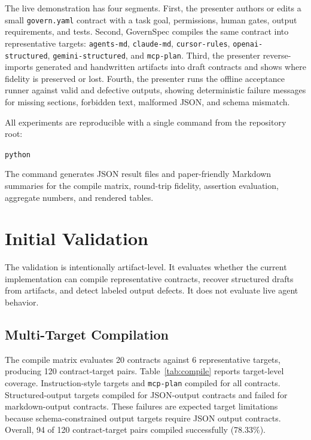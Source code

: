 \documentclass[10pt,conference]{IEEEtran}
\begin{document}
The live demonstration has four segments. First, the presenter authors or edits a
small \texttt{govern.yaml} contract with a task goal, permissions, human gates,
output requirements, and tests. Second, GovernSpec compiles the same contract into
representative targets: \texttt{agents-md}, \texttt{claude-md},
\texttt{cursor-rules}, \texttt{openai-structured}, \texttt{gemini-structured}, and
\texttt{mcp-plan}. Third, the presenter reverse-imports generated and handwritten
artifacts into draft contracts and shows where fidelity is preserved or lost.
Fourth, the presenter runs the offline acceptance runner against valid and defective
outputs, showing deterministic failure messages for missing sections, forbidden
text, malformed JSON, and schema mismatch.

All experiments are reproducible with a single command from the repository root:
\begin{center}
\footnotesize\texttt{python} 
\end{center}
The command generates JSON result files and paper-friendly Markdown summaries for
the compile matrix, round-trip fidelity, assertion evaluation, aggregate numbers,
and rendered tables.

\section{Initial Validation}

The validation is intentionally artifact-level. It evaluates whether the current
implementation can compile representative contracts, recover structured drafts from
artifacts, and detect labeled output defects. It does not evaluate live agent
behavior.

\subsection{Multi-Target Compilation}

The compile matrix evaluates 20 contracts against 6 representative targets, producing
120 contract-target pairs. Table~\ref{tab:compile} reports target-level coverage.
Instruction-style targets and \texttt{mcp-plan} compiled for all contracts.
Structured-output targets compiled for JSON-output contracts and failed for
markdown-output contracts. These failures are expected target limitations because
schema-constrained output targets require JSON output contracts. Overall, 94 of 120
contract-target pairs compiled successfully (78.33\%).
\end{document}
